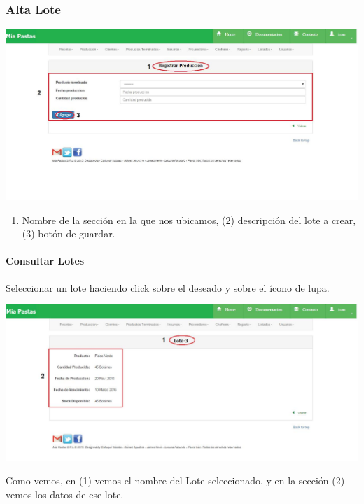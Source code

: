 \documentclass[letterpaper,10pt,english]{sphinxmanual}
\begin{document}
\subsubsection{Alta Lote}
\label{lotes:alta-lote}
\includegraphics{lotes_alta.jpg}
\begin{enumerate}
\item {} 
Nombre de la sección en la que nos ubicamos, (2) descripción del lote a crear, (3) botón de guardar.

\end{enumerate}


\paragraph{{}Consultar Lotes}
\label{lotes consultar:consultar-lotes}\label{lotes consultar::doc}
Seleccionar un lote haciendo click sobre el deseado y sobre el ícono de lupa.

\includegraphics{lotes_detalle.jpg}

Como vemos, en (1) vemos el nombre del Lote seleccionado, y en la sección (2) vemos los datos de ese lote.
\end{document}
